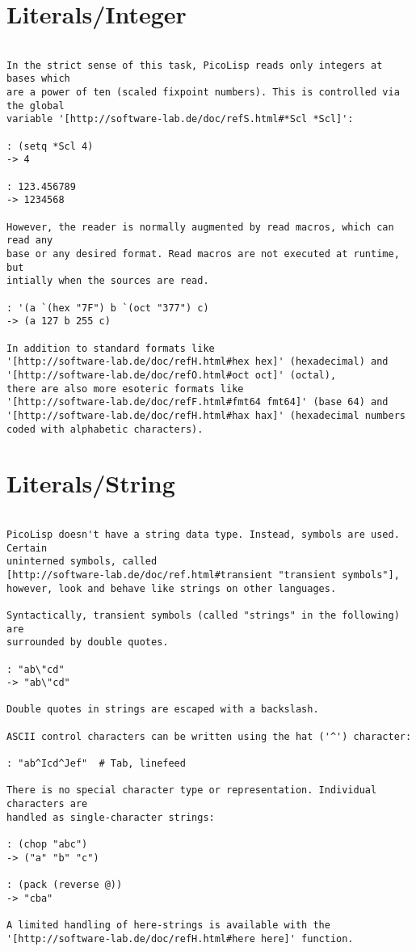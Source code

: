 \section*{Literals/Integer}

\begin{verbatim}

In the strict sense of this task, PicoLisp reads only integers at bases which
are a power of ten (scaled fixpoint numbers). This is controlled via the global
variable '[http://software-lab.de/doc/refS.html#*Scl *Scl]':

: (setq *Scl 4)
-> 4

: 123.456789
-> 1234568

However, the reader is normally augmented by read macros, which can read any
base or any desired format. Read macros are not executed at runtime, but
intially when the sources are read.

: '(a `(hex "7F") b `(oct "377") c)
-> (a 127 b 255 c)

In addition to standard formats like
'[http://software-lab.de/doc/refH.html#hex hex]' (hexadecimal) and
'[http://software-lab.de/doc/refO.html#oct oct]' (octal),
there are also more esoteric formats like
'[http://software-lab.de/doc/refF.html#fmt64 fmt64]' (base 64) and
'[http://software-lab.de/doc/refH.html#hax hax]' (hexadecimal numbers
coded with alphabetic characters).

\end{verbatim}

\section*{Literals/String}

\begin{verbatim}

PicoLisp doesn't have a string data type. Instead, symbols are used. Certain
uninterned symbols, called
[http://software-lab.de/doc/ref.html#transient "transient symbols"],
however, look and behave like strings on other languages.

Syntactically, transient symbols (called "strings" in the following)  are
surrounded by double quotes.

: "ab\"cd"
-> "ab\"cd"

Double quotes in strings are escaped with a backslash.

ASCII control characters can be written using the hat ('^') character:

: "ab^Icd^Jef"  # Tab, linefeed

There is no special character type or representation. Individual characters are
handled as single-character strings:

: (chop "abc")
-> ("a" "b" "c")

: (pack (reverse @))
-> "cba"

A limited handling of here-strings is available with the
'[http://software-lab.de/doc/refH.html#here here]' function.

\end{verbatim}

